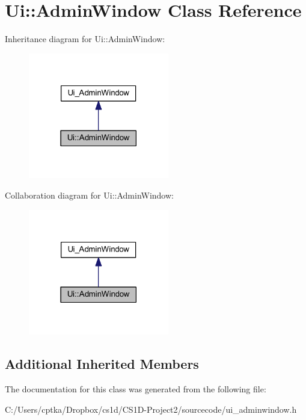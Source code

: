 \hypertarget{class_ui_1_1_admin_window}{}\section{Ui\+:\+:Admin\+Window Class Reference}
\label{class_ui_1_1_admin_window}


Inheritance diagram for Ui\+:\+:Admin\+Window\+:
\nopagebreak
\begin{figure}[H]
\begin{center}
\leavevmode
\includegraphics[width=174pt]{class_ui_1_1_admin_window__inherit__graph}
\end{center}
\end{figure}


Collaboration diagram for Ui\+:\+:Admin\+Window\+:
\nopagebreak
\begin{figure}[H]
\begin{center}
\leavevmode
\includegraphics[width=174pt]{class_ui_1_1_admin_window__coll__graph}
\end{center}
\end{figure}
\subsection*{Additional Inherited Members}


The documentation for this class was generated from the following file\+:\begin{DoxyCompactItemize}
\item 
C\+:/\+Users/cptka/\+Dropbox/cs1d/\+C\+S1\+D-\/\+Project2/sourcecode/ui\+\_\+adminwindow.\+h\end{DoxyCompactItemize}
